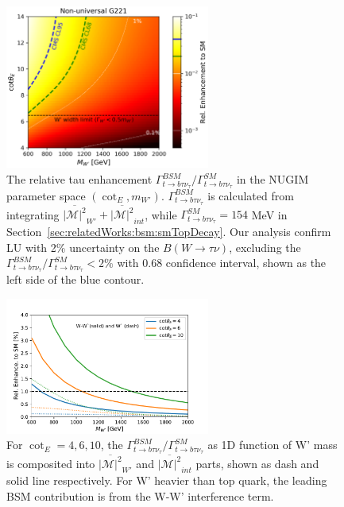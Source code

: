 \begin{figure}
    \centering
    \includegraphics[width=0.6\textwidth]{chapters/RelatedWorks/sectionBSM/figures/RelEnhance.png} 
    \caption{The relative tau enhancement $ \Gamma_{t\to b \tau \nu_\tau}^{BSM} / \Gamma_{t\to b \tau \nu_\tau}^{SM} $ in the NUGIM parameter space $(\cot_E, m_{W'})$. $\Gamma_{t\to b \tau \nu_\tau}^{BSM} $ is calculated from integrating $\overline{ |\mathcal{M}|^2 } _{W'} +  \overline{ |\mathcal{M}|^2 } _{int}$, while $\Gamma_{t\to b \tau \nu_\tau}^{SM}=154$ MeV in Section~\ref{sec:relatedWorks:bsm:smTopDecay}.  Our analysis confirm LU with 2\% uncertainty on the $B(W\to \tau \nu)$, excluding the $ \Gamma_{t\to b \tau \nu_\tau}^{BSM} / \Gamma_{t\to b \tau \nu_\tau}^{SM} <2\% $ with 0.68 confidence interval, shown as the left side of the blue contour.}
    \label{fig:relatedWorks:bsm:WPrime:tauEnhancement}
\end{figure}


\begin{figure}
    \centering
    \includegraphics[width=0.6\textwidth]{chapters/RelatedWorks/sectionBSM/figures/RelEnhance1D.pdf} 
    \caption{For $\cot_E=4,6,10$, the $\Gamma_{t\to b \tau \nu_\tau}^{BSM}/  \Gamma_{t\to b \tau \nu_\tau}^{SM} $ as 1D function of W' mass is composited into $\overline{ |\mathcal{M}|^2 } _{W'} $ and $\overline{ |\mathcal{M}|^2 } _{int}$  parts, shown as dash and solid line respectively. For W' heavier than top quark, the leading BSM contribution is from the W-W' interference term. }
    \label{fig:relatedWorks:bsm:WPrime:tauEnhancement1d}
\end{figure}



